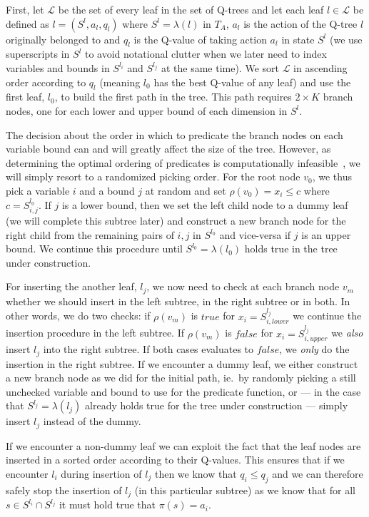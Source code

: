 First, let $\mathcal{L}$ be the set of every leaf in the set of Q-trees and let
each leaf $l \in \mathcal{L}$ be defined as $l = (S^{l}, a_l, q_l)$ where $S^{l} =
\lambda(l)$ in $T_A$, $a_l$ is the action of the Q-tree $l$ originally belonged to
and $q_l$ is the Q-value of taking action $a_l$ in state $S^{l }$ (we use
superscripts in $S^l$ to avoid notational clutter when we later need to index
variables and bounds in $S^{l_i}$ and $S^{l_j}$ at the same time). We sort
$\mathcal{L}$ in ascending order according to $q_l$ (meaning $l_0$ has the best
Q-value of any leaf) and use the first leaf, $l_0$, to build the first path in
the tree. This path requires $2 \times K$ branch nodes, one for each lower and
upper bound of each dimension in  $S^{l}$.

The decision about the order in which to predicate the branch nodes on each
variable bound can and will greatly affect the size of the tree. However, as
determining the optimal ordering of predicates is computationally
infeasible~\cite{HYAFIL197615}, we will simply resort to a randomized picking
order.  For the root node $v_0$, we thus pick a variable $i$ and a bound $j$ at
random and set $\rho(v_0) = x_i \le c$ where $c = S^{l_0}_{i,j}$. If $j$ is a
lower bound, then we set the left child node to a dummy leaf (we will complete
this subtree later) and construct a new branch node for the right child from the
remaining pairs of $i, j$ in $S^{l_0}$ and vice-versa if $j$ is an upper bound.
We continue this procedure until $S^{l_0} = \lambda(l_0)$ holds true in the tree
under construction.

For inserting the another leaf, $l_j$, we now need to check at each branch node
$v_m$ whether we should insert in the left subtree, in the right subtree or in
both.  In other words, we do two checks: if $\rho(v_m)$ is $true$ for $x_i =
S^{l_j}_{i,lower}$ we continue the insertion procedure in the left subtree.  If
$\rho(v_m)$ is $false$ for $x_i = S^{l_j}_{i, upper}$ we \textit{also} insert
$l_j$ into the right subtree. If both cases evaluates to $false$, we
\textit{only} do the insertion in the right subtree. If we encounter a dummy
leaf, we either construct a new branch node as we did for the initial path, ie.\ by
randomly picking a still unchecked variable and bound to use for the predicate
function, or --- in the case that $S^{l_j} = \lambda(l_j)$ already holds true
for the tree under construction --- simply insert $l_j$ instead of the dummy.

If we encounter a non-dummy leaf we can exploit the fact that the leaf nodes are
inserted in a sorted order according to their Q-values. This ensures that if we
encounter $l_i$ during insertion of $l_j$ then we know that $q_i \le  q_j$ and
we can therefore safely stop the insertion of $l_j$ (in this particular subtree)
as we know that for all $s \in S^{l_i} \cap S^{l_j}$ it must hold true that
$\pi(s) = a_i$.

